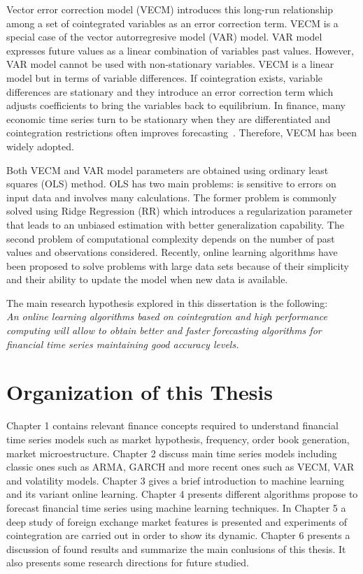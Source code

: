 Vector error correction model (VECM) introduces this long-run relationship
among a set of cointegrated variables as an error correction term. VECM is a
special case of the vector autorregresive model (VAR) model. VAR model
expresses future values as a linear combination of variables past values.
However, VAR model cannot be used with non-stationary variables. VECM is a
linear model but in terms of variable differences. If cointegration exists,
variable differences are stationary and they introduce an error correction term
which adjusts coefficients to bring the variables back to equilibrium. In
finance, many economic time series turn to be stationary when they are
differentiated and cointegration restrictions often improves
forecasting~\cite{duy1998}. Therefore, VECM has been widely adopted.

Both VECM and VAR model parameters are obtained using ordinary least squares
(OLS) method. OLS has two main problems: is sensitive to errors on input data
and involves many calculations. The former problem is commonly solved using
Ridge Regression (RR) \cite{hoerl1970} which introduces a regularization
parameter that leads to an unbiased estimation with better generalization
capability. The second problem of computational complexity depends on the number
of past values and observations considered.  Recently, online learning
algorithms have been proposed to solve problems with large data sets because of
their simplicity and their ability to update the model when new data is
available. 

The main research hypothesis explored in this dissertation is the following:
\\

\textit{An online learning algorithms based on cointegration and high
performance computing will allow to obtain better and faster forecasting
algorithms for financial time series maintaining good accuracy levels.}


\section{Organization of this Thesis}

Chapter 1 contains relevant finance concepts required to understand financial
time series models such as market hypothesis, frequency, order book generation,
market microestructure.
Chapter 2 discuss main time series models including classic ones such as ARMA,
GARCH and more recent ones such as VECM, VAR and volatility models. %
Chapter 3 gives a brief introduction to machine learning and its variant online
learning. 
Chapter 4 presents different algorithms propose to forecast financial time
series using machine learning techniques.
In Chapter 5 a deep study of foreign exchange market features is presented and
experiments of cointegration are carried out in order to show its dynamic.
Chapter 6 presents a discussion of found results and summarize the main
conlusions of this thesis. It also presents some research directions for future
studied.


